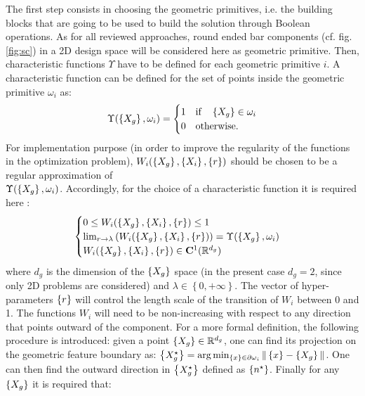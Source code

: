 The first step consists in choosing the geometric primitives, i.e. the building blocks that are going to be used to build the solution through Boolean operations. As for all reviewed approaches, round ended bar components (cf. fig. \ref{fig:sc}) in a 2D design space will be considered here as geometric primitive. Then, characteristic functions $\Upsilon$ have to be defined for each geometric primitive $i$. A characteristic function can be defined for the set of points inside the geometric primitive $\omega_i$ as:
  \begin{equation}
  \Upsilon(\left\{{X_g}\right\},\omega_i)=\begin{cases}
        1 & \text{if} \quad \left\{{X_g}\right\}\in \omega_i \\
        0 & \text{otherwise}.
        \end{cases}
 \end{equation}
 For implementation purpose  (in order to improve the regularity of the functions in the optimization problem), $W_i(\left\{{X_g}\right\},\left\{{X_i}\right\},\left\{{r}\right\})$ should be chosen to be a regular approximation of\\ $\Upsilon(\left\{{X_g}\right\},\omega_i)$.
 Accordingly, for the choice of a characteristic function it is required here :
 \begin{equation}
\begin{cases}
     0\leq W_i(\left\{{X_g}\right\},\left\{{X_i}\right\},\left\{{r}\right\})\leq 1\\
     \lim_{r\to\lambda}\left(W_i(\left\{{X_g}\right\},\left\{{X_i}\right\},\left\{{r}\right\})\right)= \Upsilon(\left\{{X_g}\right\},\omega_i)\\
      W_i(\left\{{X_g}\right\},\left\{{X_i}\right\},\left\{{r}\right\})\in \mathbf{C}^{1}(\mathbb{R}^{d_g}) \\
     \end{cases}
 \end{equation}
 where $d_g$ is the dimension of the $\left\{{X_g}\right\}$ space (in the present case $d_g=2$, since only 2D problems are considered) and  $\lambda\in\left\lbrace0,+\infty\right\rbrace$.
 The vector of hyper-parameters $\left\{{r}\right\}$ will control the length scale of the transition of  $W_i$ between 0 and 1.  The functions $W_i$ will need to be non-increasing with respect to any direction that points outward of the component. For a more formal definition, the following procedure is introduced: given a point $\left\{{X_g}\right\}\in \mathbb{R}^{d_g}$, one can find its projection on the geometric feature boundary as: $\left\{{{X}^\star_g}\right\}=\arg \min_{\left\{{x}\right\}\in \partial \omega_i} \|\left\{{x}\right\}-\left\{{X_g}\right\}\| $.
 One can then find the outward direction in $\left\{{{X}^\star_g}\right\}$ defined as $\left\{{n^\star}\right\}$. Finally for any $\left\{{X_g}\right\}$ it is required that:
